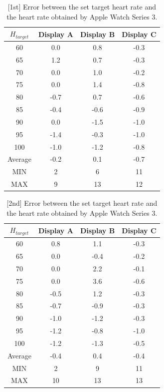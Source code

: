 \documentclass[sigchi,authordraft]{acmart}
\begin{document}
\begin{table}[!t]
  \centering
  \caption{[1st] Error between the set target heart rate and the heart rate obtained by Apple Watch Series 3.}
  \begin{tabular}{c|c|c|c} \hline\hline
    $H_{target}$ & Display A & Display B & Display C \\ \hline
    60 & 0.0 & 0.8 & -0.3 \\
    65 & 1.2 & 0.7 & -0.3 \\
    70 & 0.0 & 1.0 & -0.2 \\
    75 & 0.0 & 1.4 & -0.8 \\
    80 & -0.7 & 0.7 & -0.6 \\
    85 & -0.4 & -0.6 & -0.9 \\
    90 & 0.0 & -1.5 & -1.0 \\
    95 & -1.4 & -0.3 & -1.0 \\
    100 & -1.0 & -1.2 & -0.8 \\ \hline
    Average & -0.2 & 0.1 & -0.7 \\ \hline \hline
    MIN & 2 & 6 & 11 \\ \hline
    MAX & 9 & 13 & 12 \\ \hline
  \end{tabular}
  \label{tab:series3_result_1st}
\end{table}

\begin{table}[!t]
  \centering
  \caption{[2nd] Error between the set target heart rate and the heart rate obtained by Apple Watch Series 3.}
  \begin{tabular}{c|c|c|c} \hline\hline
    $H_{target}$ & Display A & Display B & Display C \\ \hline
    60 & 0.8 & 1.1 & -0.3 \\
    65 & 0.0 & -0.4 & -0.2 \\
    70 & 0.0 & 2.2 & -0.1 \\
    75 & 0.0 & 3.6 & -0.6 \\
    80 & -0.5 & 1.2 & -0.3 \\
    85 & -0.7 & -0.9 & -0.3 \\
    90 & -1.0 & -1.2 & -0.3 \\
    95 & -1.2 & -0.8 & -1.0 \\
    100 & -1.2 & -1.3 & -0.5 \\ \hline
    Average & -0.4 & 0.4 & -0.4 \\ \hline \hline
    MIN & 2 & 9 & 11 \\ \hline
    MAX & 10 & 13 & 13 \\ \hline
  \end{tabular}
  \label{tab:series3_result_2nd}
\end{table}
\end{document}
